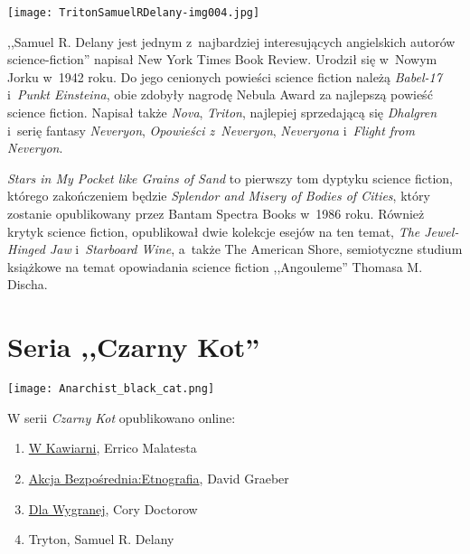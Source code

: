\documentclass[oneside,polish,11pt,rmheadings]{mwbk}
\begin{document}
\begin{center} \texttt{[image: TritonSamuelRDelany-img004.jpg]} \end{center}

,,Samuel R. Delany jest jednym z~najbardziej interesujących angielskich autorów science-fiction'' napisał New York Times Book Review. Urodził się w~Nowym Jorku w~1942 roku. Do jego cenionych powieści science fiction należą \textit{Babel-17} i~\textit{Punkt Einsteina}, obie zdobyły nagrodę Nebula Award za najlepszą powieść science fiction. Napisał także \textit{Nova}, \textit{Triton}, najlepiej sprzedającą się \textit{Dhalgren }i~serię fantasy \textit{Neveryon}, \textit{Opowieści z~Neveryon}, \textit{Neveryona} i~\textit{Flight from Neveryon}. 

\textit{Stars in My Pocket like Grains of Sand} to pierwszy tom dyptyku science fiction, którego zakończeniem będzie \textit{Splendor and Misery of Bodies of Cities}, który zostanie opublikowany przez Bantam Spectra Books w~1986 roku. Również krytyk science fiction, opublikował dwie kolekcje esejów na ten temat, \textit{The Jewel-Hinged Jaw} i~\textit{Starboard Wine}, a~także The American Shore, semiotyczne studium książkowe na temat opowiadania science fiction ,,Angouleme'' Thomasa M. Discha. 


\newpage
\printendnotes

\chapter*{Seria ,,Czarny Kot''}


\begin{center}
\texttt{[image: Anarchist\_black\_cat.png]}

\begin{large}
W serii \textit{Czarny Kot} opublikowano online:
\end{large} 
\end{center}

\begin{enumerate}
\item \href{https://archive.org/details/errico-malatesta-w-kawiarni}{W Kawiarni}, Errico Malatesta
\item \href{https://archive.org/details/david-graeber-akcja-bezposrednia}{Akcja Bezpośrednia:Etnografia}, David Graeber
\item \href{https://archive.org/details/cory-doctorow-dla-wygranej}{Dla Wygranej}, Cory Doctorow
\item Tryton, Samuel R. Delany  
\end{enumerate}
\end{document}
